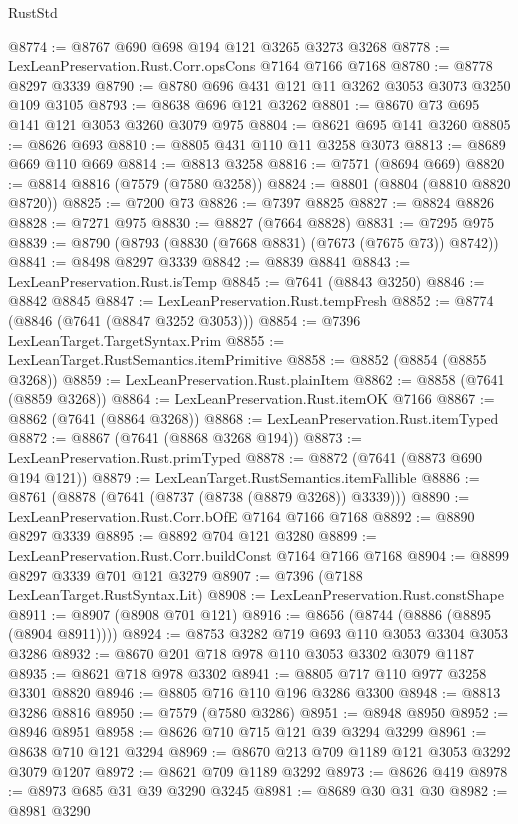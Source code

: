 \begin{lexlean}{RustStd}
\begin{coremodule}
@8774 := @8767 @690 @698 @194 @121 @3265 @3273 @3268
@8778 := LexLeanPreservation.Rust.Corr.opsCons @7164 @7166 @7168
@8780 := @8778 @8297 @3339
@8790 := @8780 @696 @431 @121 @11 @3262 @3053 @3073 @3250 @109 @3105
@8793 := @8638 @696 @121 @3262
@8801 := @8670 @73 @695 @141 @121 @3053 @3260 @3079 @975
@8804 := @8621 @695 @141 @3260
@8805 := @8626 @693
@8810 := @8805 @431 @110 @11 @3258 @3073
@8813 := @8689 @669 @110 @669
@8814 := @8813 @3258
@8816 := @7571 (@8694 @669)
@8820 := @8814 @8816 (@7579 (@7580 @3258))
@8824 := @8801 (@8804 (@8810 @8820 @8720))
@8825 := @7200 @73
@8826 := @7397 @8825
@8827 := @8824 @8826
@8828 := @7271 @975
@8830 := @8827 (@7664 @8828)
@8831 := @7295 @975
@8839 := @8790 (@8793 (@8830 (@7668 @8831) (@7673 (@7675 @73)) @8742))
@8841 := @8498 @8297 @3339
@8842 := @8839 @8841
@8843 := LexLeanPreservation.Rust.isTemp
@8845 := @7641 (@8843 @3250)
@8846 := @8842 @8845
@8847 := LexLeanPreservation.Rust.tempFresh
@8852 := @8774 (@8846 (@7641 (@8847 @3252 @3053)))
@8854 := @7396 LexLeanTarget.TargetSyntax.Prim
@8855 := LexLeanTarget.RustSemantics.itemPrimitive
@8858 := @8852 (@8854 (@8855 @3268))
@8859 := LexLeanPreservation.Rust.plainItem
@8862 := @8858 (@7641 (@8859 @3268))
@8864 := LexLeanPreservation.Rust.itemOK @7166
@8867 := @8862 (@7641 (@8864 @3268))
@8868 := LexLeanPreservation.Rust.itemTyped
@8872 := @8867 (@7641 (@8868 @3268 @194))
@8873 := LexLeanPreservation.Rust.primTyped
@8878 := @8872 (@7641 (@8873 @690 @194 @121))
@8879 := LexLeanTarget.RustSemantics.itemFallible
@8886 := @8761 (@8878 (@7641 (@8737 (@8738 (@8879 @3268)) @3339)))
@8890 := LexLeanPreservation.Rust.Corr.bOfE @7164 @7166 @7168
@8892 := @8890 @8297 @3339
@8895 := @8892 @704 @121 @3280
@8899 := LexLeanPreservation.Rust.Corr.buildConst @7164 @7166 @7168
@8904 := @8899 @8297 @3339 @701 @121 @3279
@8907 := @7396 (@7188 LexLeanTarget.RustSyntax.Lit)
@8908 := LexLeanPreservation.Rust.constShape
@8911 := @8907 (@8908 @701 @121)
@8916 := @8656 (@8744 (@8886 (@8895 (@8904 @8911))))
@8924 := @8753 @3282 @719 @693 @110 @3053 @3304 @3053 @3286
@8932 := @8670 @201 @718 @978 @110 @3053 @3302 @3079 @1187
@8935 := @8621 @718 @978 @3302
@8941 := @8805 @717 @110 @977 @3258 @3301 @8820
@8946 := @8805 @716 @110 @196 @3286 @3300
@8948 := @8813 @3286 @8816
@8950 := @7579 (@7580 @3286)
@8951 := @8948 @8950
@8952 := @8946 @8951
@8958 := @8626 @710 @715 @121 @39 @3294 @3299
@8961 := @8638 @710 @121 @3294
@8969 := @8670 @213 @709 @1189 @121 @3053 @3292 @3079 @1207
@8972 := @8621 @709 @1189 @3292
@8973 := @8626 @419
@8978 := @8973 @685 @31 @39 @3290 @3245
@8981 := @8689 @30 @31 @30
@8982 := @8981 @3290

\end{coremodule}
\end{lexlean}
